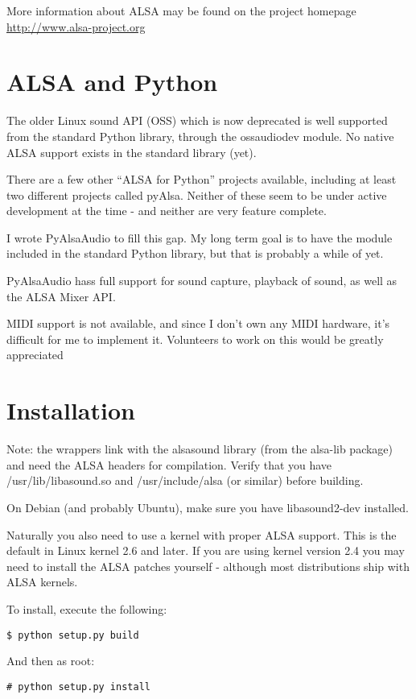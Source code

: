 \documentclass{howto}
\begin{document}
More information about ALSA may be found on the project homepage 
\url{http://www.alsa-project.org}

\section{ALSA and Python}

The older Linux sound API (OSS) which is now deprecated is well
supported from the standard Python library, through the ossaudiodev
module. No native ALSA support exists in the standard library (yet).

There are a few other ``ALSA for Python'' projects available,
including at least two different projects called pyAlsa. Neither of
these seem to be under active development at the time - and neither
are very feature complete.

I wrote PyAlsaAudio to fill this gap. My long term goal is to have the
module included in the standard Python library, but that is probably a
while of yet.

PyAlsaAudio hass full support for sound capture, playback of sound, as
well as the ALSA Mixer API.

MIDI support is not available, and since I don't own any MIDI
hardware, it's difficult for me to implement it. Volunteers to work on
this would be greatly appreciated
\section{Installation}

Note: the wrappers link with the alsasound library (from the alsa-lib
package) and need the ALSA headers for compilation.  Verify that you
have /usr/lib/libasound.so and /usr/include/alsa (or
similar) before building.

On Debian (and probably Ubuntu), make sure you have libasound2-dev installed.

Naturally you also need to use a kernel with proper ALSA support. This
is the default in Linux kernel 2.6 and later. If you are using kernel
version 2.4 you may need to install the ALSA patches yourself -
although most distributions ship with ALSA kernels.

To install, execute the following: \\
\begin{verbatim}
$ python setup.py build
\end{verbatim}

And then as root: \\
\begin{verbatim}
# python setup.py install
\end{verbatim}


\end{document}

